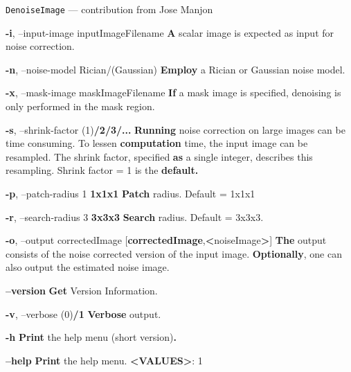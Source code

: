 \documentclass[ignorenonframetext,]{beamer}
\newenvironment{Shaded}{\begin{snugshade}}{\end{snugshade}}
\newcommand{\KeywordTok}[1]{\textcolor[rgb]{0.13,0.29,0.53}{\textbf{{#1}}}}
\newcommand{\NormalTok}[1]{{#1}}
\begin{document}
\begin{frame}[fragile]{\texttt{DenoiseImage} --- contribution from Jose
Manjon}
\begin{Shaded}
\begin{Highlighting}[]
     \KeywordTok{-i}\NormalTok{, --input-image inputImageFilename}
          \KeywordTok{A} \NormalTok{scalar image is expected as input for noise correction.}

     \KeywordTok{-n}\NormalTok{, --noise-model Rician/(Gaussian)}
          \KeywordTok{Employ} \NormalTok{a Rician or Gaussian noise model.}

     \KeywordTok{-x}\NormalTok{, --mask-image maskImageFilename}
          \KeywordTok{If} \NormalTok{a mask image is specified, denoising is only performed in the mask region.}

     \KeywordTok{-s}\NormalTok{, --shrink-factor (1)}\KeywordTok{/2/3/...}
          \KeywordTok{Running} \NormalTok{noise correction on large images can be time consuming. To lessen}
          \KeywordTok{computation} \NormalTok{time, the input image can be resampled. The shrink factor, specified}
          \KeywordTok{as} \NormalTok{a single integer, describes this resampling. Shrink factor = 1 is the}
          \KeywordTok{default.}

     \KeywordTok{-p}\NormalTok{, --patch-radius 1}
                        \KeywordTok{1x1x1}
          \KeywordTok{Patch} \NormalTok{radius. Default = 1x1x1}

     \KeywordTok{-r}\NormalTok{, --search-radius 3}
                         \KeywordTok{3x3x3}
          \KeywordTok{Search} \NormalTok{radius. Default = 3x3x3.}

     \KeywordTok{-o}\NormalTok{, --output correctedImage}
                  \NormalTok{[}\KeywordTok{correctedImage}\NormalTok{,}\KeywordTok{<}\NormalTok{noiseImage}\KeywordTok{>}\NormalTok{]}
          \KeywordTok{The} \NormalTok{output consists of the noise corrected version of the input image.}
          \KeywordTok{Optionally}\NormalTok{, one can also output the estimated noise image.}

     \KeywordTok{--version}
          \KeywordTok{Get} \NormalTok{Version Information.}

     \KeywordTok{-v}\NormalTok{, --verbose (0)}\KeywordTok{/1}
          \KeywordTok{Verbose} \NormalTok{output.}

     \KeywordTok{-h}
          \KeywordTok{Print} \NormalTok{the help menu (short version)}\KeywordTok{.}

     \KeywordTok{--help}
          \KeywordTok{Print} \NormalTok{the help menu.}
          \KeywordTok{<VALUES>}\NormalTok{: 1}
\end{Highlighting}
\end{Shaded}

\end{frame}
\end{document}
